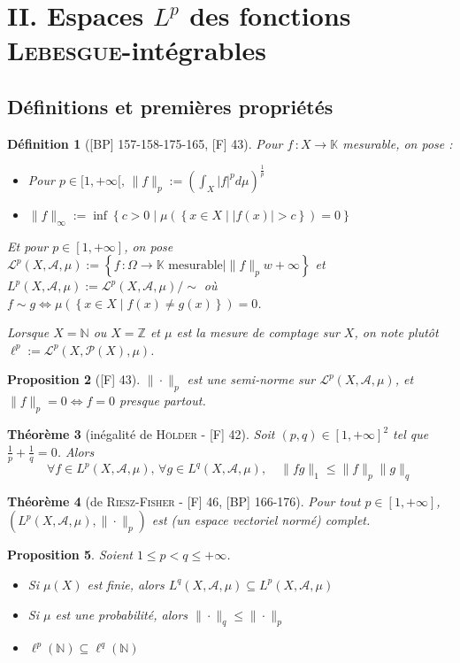 \documentclass[10pt, a4paper, parskip=full, twoside, twocolumn]{report}
\newtheorem{definition}{Définition}
\newtheorem{theorem}[definition]{Théorème}
\newtheorem{proposition}[definition]{Proposition}
\newcommand{\IN}{\mathbb{N}}
\newcommand{\IZ}{\mathbb{Z}}
\newcommand{\IK}{\mathbb{K}}
\newcommand{\A}{\mathscr{A}}
\begin{document}
\section*{II. Espaces $L^p$ des fonctions \textsc{Lebesgue}-intégrables}
\subsection*{Définitions et premières propriétés}

\begin{definition}[\textnormal{[BP] 157-158-175-165, [F] 43}]
	Pour $f\,\colon X\to \IK$ mesurable, on pose :
	\begin{itemize}
		\item Pour $p\in [1,+\infty[,\, \|f\|_p := \left(\int_X \lvert f \rvert^p d\mu\right)^{\frac{1}{p}}$
		\item $\|f\|_{\infty} := \inf \left\{c > 0 \mid \mu\left(\left\{x\in X\mid \lvert f(x)\rvert > c\right\}\right) = 0\right\}$
	\end{itemize}
	Et pour $p\in [1,+\infty]$, on pose $\mathcal{L}^p(X,\A,\mu) := \left\{f\,\colon\Omega\to\IK\text{ mesurable}\mid \|f\|_p w +\infty\right\}$
	et $L^p(X,\A,\mu) := \mathcal{L}^p(X,\A,\mu) / \sim$ où $f\sim g\iff \mu\left(\left\{x\in X\mid f(x)\neq g(x)\right\}\right) = 0$.

	Lorsque $X = \IN$ ou $X = \IZ$ et $\mu$ est la mesure de comptage sur $X$, on note plutôt $\ell^p := \mathcal{L}^p(X,\mathcal{P}(X), \mu)$.
\end{definition}

\begin{proposition}[\textnormal{[F] 43}]
	$\|\cdot\|_p$ est une semi-norme sur $\mathcal{L}^p(X,\A,\mu)$, et $\|f\|_p = 0\iff f=0$ presque partout.
\end{proposition}

\begin{theorem}[inégalité de \textsc{Hölder} - \textnormal{[F] 42}]
	Soit $(p,q)\in[1, +\infty]^2$ tel que $\frac{1}{p} + \frac{1}{q} = 0$. Alors 
	$$\forall f\in L^p(X,\A,\mu),\, \forall g\in L^q(X,\A, \mu),\quad \|fg\|_1\leq \|f\|_p\|g\|_q$$
\end{theorem}

\begin{theorem}[de \textsc{Riesz-Fisher} - \textnormal{[F] 46, [BP] 166-176}]
	Pour tout $p\in[1,+\infty]$, $(L^p(X,\A,\mu), \|\cdot\|_p)$ est (un espace vectoriel normé) complet.
\end{theorem}

\begin{proposition}
	Soient $1\leq p < q \leq +\infty$.
	\begin{itemize}
		\item Si $\mu(X)$ est finie, alors $L^q(X,\A,\mu) \subseteq L^p(X,\A,\mu)$
		\item Si $\mu$ est une probabilité, alors $\|\cdot\|_q \leq \|\cdot\|_p$
		\item $\ell^p(\IN) \subseteq \ell^q(\IN)$
	\end{itemize}
\end{proposition}
\end{document}
